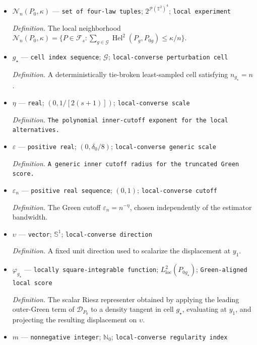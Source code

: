 \documentclass{article}
\begin{document}
\begin{itemize}
  \item \(\mathcal N_n(P_0,\kappa)\) --- \texttt{set of four-\allowbreak{}law tuples}; \(2^{\mathcal P(\mathbb T^2)^4}\); \texttt{local experiment}
  \par\smallskip\noindent\emph{Definition.} The local neighborhood \(\mathcal N_n(P_0,\kappa)=\{P\in\mathcal F_s:\sum_{g\in\mathcal G}\operatorname{Hel}^2(P_g,P_{0g})\le\kappa/n\}\).
  \item \(g_\star\) --- \texttt{cell index sequence}; \(\mathcal G\); \texttt{local-\allowbreak{}converse perturbation cell}
  \par\smallskip\noindent\emph{Definition.} A deterministically tie-broken least-sampled cell satisfying \(n_{g_\star}=n\).
  \item \(\eta\) --- \texttt{real}; \((0,1/[2(s+1)])\); \texttt{local-\allowbreak{}converse scale}
  \par\smallskip\noindent\emph{Definition.} \texttt{The polynomial inner-\allowbreak{}cutoff exponent for the local alternatives.}
  \item \(\varepsilon\) --- \texttt{positive real}; \((0,\delta_0/8)\); \texttt{local-\allowbreak{}converse generic scale}
  \par\smallskip\noindent\emph{Definition.} \texttt{A generic inner cutoff radius for the truncated Green score.}
  \item \(\varepsilon_n\) --- \texttt{positive real sequence}; \((0,1)\); \texttt{local-\allowbreak{}converse cutoff}
  \par\smallskip\noindent\emph{Definition.} The Green cutoff \(\varepsilon_n=n^{-\eta}\), chosen independently of the estimator bandwidth.
  \item \(\upsilon\) --- \texttt{vector}; \(\mathbb S^1\); \texttt{local-\allowbreak{}converse direction}
  \par\smallskip\noindent\emph{Definition.} A fixed unit direction used to scalarize the displacement at \(y_1\).
  \item \(\varphi_{g_\star}\) --- \texttt{locally square-\allowbreak{}integrable function}; \(L^2_{\mathrm{loc}}(P_{0g_\star})\); \texttt{Green-\allowbreak{}aligned local score}
  \par\smallskip\noindent\emph{Definition.} The scalar Riesz representer obtained by applying the leading outer-Green term of \(\mathcal D_{P_0}\) to a density tangent in cell \(g_\star\), evaluating at \(y_1\), and projecting the resulting displacement on \(\upsilon\).
  \item \(m\) --- \texttt{nonnegative integer}; \(\mathbb N_0\); \texttt{local-\allowbreak{}converse regularity index}

\end{itemize}
\end{document}
